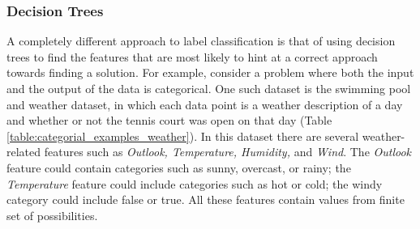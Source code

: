 \subsubsection{Decision Trees}
\label{sec:decision_trees}
A completely different approach to label classification is that of using decision trees to find the features that are most likely to hint at a correct approach towards finding a solution. For example, consider a problem where both the input and the output of the data is categorical. One such dataset is the swimming pool and weather dataset, in which each data point is a weather description of a day and whether or not the tennis court was open on that day (Table \ref{table:categorial_examples_weather}). In this dataset there are several weather-related features such as \textit{Outlook, Temperature, Humidity,} and \textit{Wind}. The \textit{Outlook} feature could contain categories such as sunny, overcast, or rainy; the \textit{Temperature} feature could include categories such as hot or cold; the windy category could include false or true. All these features contain values from finite set of possibilities. 

